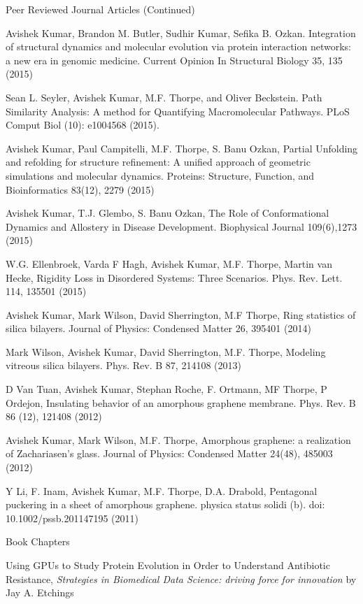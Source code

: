 \begin{cventries}
\cventry
    {}
    {Peer Reviewed Journal Articles (Continued)}
    {}
    {}
    {
\begin{cvitems}
    \setlength\itemsep{.5em}
    \small
    \item Avishek Kumar, Brandon M. Butler, Sudhir Kumar, Sefika B. Ozkan. Integration of structural
dynamics and molecular evolution via protein interaction networks: a new era in genomic medicine.
Current Opinion In Structural Biology 35, 135 (2015)    
    \item Sean L. Seyler, Avishek Kumar, M.F. Thorpe, and Oliver Beckstein. Path Similarity Analysis: A
method for Quantifying Macromolecular Pathways. PLoS Comput Biol (10): e1004568 (2015).
    \item Avishek Kumar, Paul Campitelli, M.F. Thorpe, S. Banu Ozkan, Partial Unfolding and refolding for
structure refinement: A unified approach of geometric simulations and molecular dynamics. Proteins:
Structure, Function, and Bioinformatics 83(12), 2279 (2015)
    \item Avishek Kumar, T.J. Glembo, S. Banu Ozkan, The Role of Conformational Dynamics and Allostery in
Disease Development. Biophysical Journal 109(6),1273 (2015)
    \item W.G. Ellenbroek, Varda F Hagh, Avishek Kumar, M.F. Thorpe, Martin van Hecke, Rigidity Loss in
Disordered Systems: Three Scenarios. Phys. Rev. Lett. 114, 135501 (2015)
    \item Avishek Kumar, Mark Wilson, David Sherrington, M.F Thorpe, Ring statistics of silica bilayers.
Journal of Physics: Condensed Matter 26, 395401 (2014)
    \item Mark Wilson, Avishek Kumar, David Sherrington, M.F. Thorpe, Modeling vitreous silica bilayers.
Phys. Rev. B 87, 214108 (2013)
    \item D Van Tuan, Avishek Kumar, Stephan Roche, F. Ortmann, MF Thorpe, P Ordejon, Insulating behavior
of an amorphous graphene membrane. Phys. Rev. B 86 (12), 121408 (2012)
    \item Avishek Kumar, Mark Wilson, M.F. Thorpe, Amorphous graphene: a realization of Zachariasen’s
glass. Journal of Physics: Condensed Matter 24(48), 485003 (2012)
    \item Y Li, F. Inam, Avishek Kumar, M.F. Thorpe, D.A. Drabold, Pentagonal puckering in a sheet of
amorphous graphene. physica status solidi (b). doi: 10.1002/pssb.201147195 (2011)
\end{cvitems}
}



\cventry{}
    {Book Chapters}
    {}
    {}
    {\begin{cvitems}
    \setlength\itemsep{1em}
    \small
    \item Using GPUs to Study Protein Evolution in Order to Understand Antibiotic Resistance, \textit{Strategies in Biomedical Data Science: driving force for innovation} by Jay A. Etchings
\end{cvitems}}




\end{cventries}
